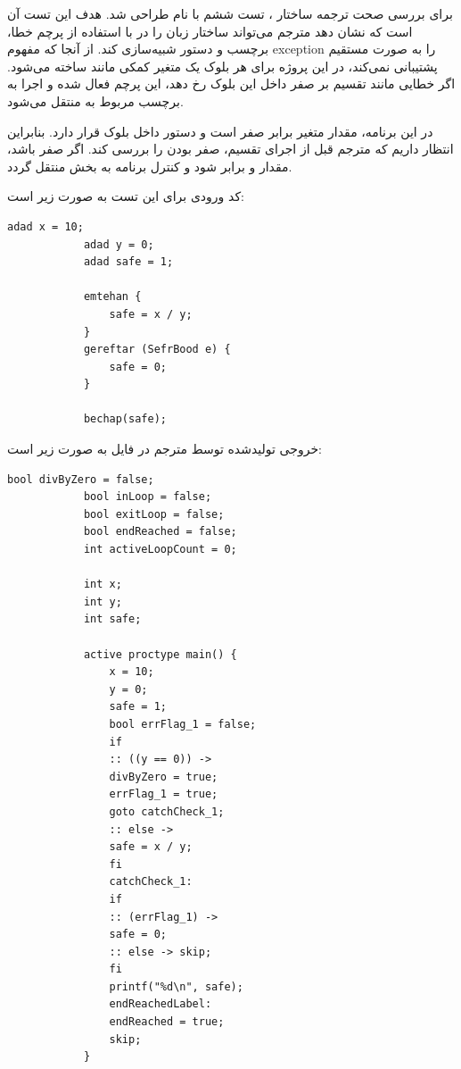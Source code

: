 \documentclass[12pt]{report}
\begin{document}
	برای بررسی صحت ترجمه ساختار ، تست ششم با نام  طراحی شد. 
	هدف این تست آن است که نشان دهد مترجم می‌تواند ساختار  زبان  را در  با استفاده از پرچم خطا، برچسب و دستور  شبیه‌سازی کند. 
	از آنجا که  مفهوم exception را به صورت مستقیم پشتیبانی نمی‌کند، در این پروژه برای هر بلوک  یک متغیر کمکی مانند  ساخته می‌شود. 
	اگر خطایی مانند تقسیم بر صفر داخل این بلوک رخ دهد، این پرچم فعال شده و اجرا به برچسب مربوط به  منتقل می‌شود.
	
	
	در این برنامه، مقدار متغیر  برابر صفر است و دستور  داخل بلوک  قرار دارد. 
	بنابراین انتظار داریم که مترجم قبل از اجرای تقسیم، صفر بودن  را بررسی کند. 
	اگر  صفر باشد، مقدار  و  برابر  شود و کنترل برنامه به بخش  منتقل گردد.
	
	کد ورودی  برای این تست به صورت زیر است:
	
	\begin{latin}
		\begin{lstlisting}[style=hashstyle]
			adad x = 10;
			adad y = 0;
			adad safe = 1;
			
			emtehan {
				safe = x / y;
			}
			gereftar (SefrBood e) {
				safe = 0;
			}
			
			bechap(safe);
		\end{lstlisting}
	\end{latin}
	
	خروجی تولیدشده توسط مترجم در فایل  به صورت زیر است:
	
	\begin{latin}
		\begin{lstlisting}[style=codestyle]
			bool divByZero = false;
			bool inLoop = false;
			bool exitLoop = false;
			bool endReached = false;
			int activeLoopCount = 0;
			
			int x;
			int y;
			int safe;
			
			active proctype main() {
				x = 10;
				y = 0;
				safe = 1;
				bool errFlag_1 = false;
				if
				:: ((y == 0)) ->
				divByZero = true;
				errFlag_1 = true;
				goto catchCheck_1;
				:: else ->
				safe = x / y;
				fi
				catchCheck_1:
				if
				:: (errFlag_1) ->
				safe = 0;
				:: else -> skip;
				fi
				printf("%d\n", safe);
				endReachedLabel:
				endReached = true;
				skip;
			}
		\end{lstlisting}
	\end{latin}
	
\end{document}
